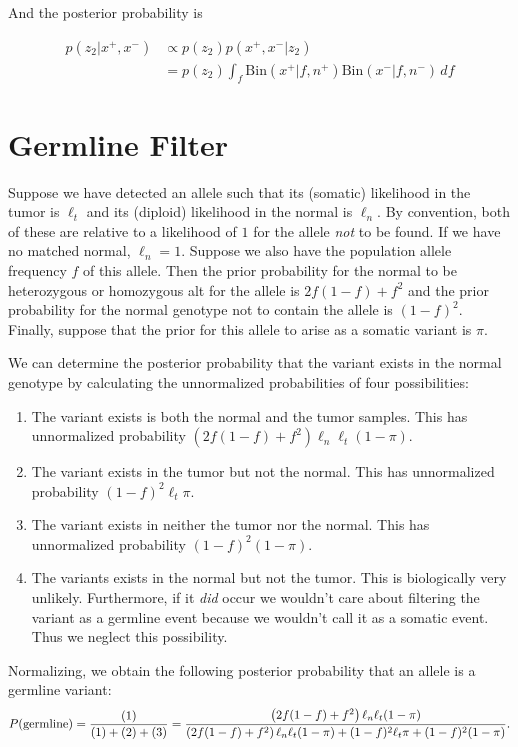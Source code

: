 \documentclass[nofootinbib,amssymb,amsmath]{revtex4}
\begin{document}
And the posterior probability is

\begin{align}
p(z_2 |x^+, x^-) & \propto p(z_2) p(x^+, x^- | z_2) \\
                         & = p(z_2) \int_{f}  \mathrm{Bin}(x^+ | f, n^+) \mathrm{Bin}(x^- | f, n^-) \,df
\end{align}


\section{Germline Filter}\label{germline-filter}
Suppose we have detected an allele such that its (somatic) likelihood in the tumor is $\ell_t$ and its (diploid) likelihood in the normal is $\ell_n$.  By convention, both of these are relative to a likelihood of $1$ for the allele \textit{not} to be found.  If we have no matched normal, $\ell_n = 1$.  Suppose we also have the population allele frequency $f$ of this allele.  Then the prior probability for the normal to be heterozygous or homozygous alt for the allele is $2f(1-f) + f^2$ and the prior probability for the normal genotype not to contain the allele is $(1-f)^2$.  Finally, suppose that the prior for this allele to arise as a somatic variant is $\pi$.

We can determine the posterior probability that the variant exists in the normal genotype by calculating the unnormalized probabilities of four possibilities:
\begin{enumerate}
\item The variant exists is both the normal and the tumor samples.  This has unnormalized probability $\left(2f(1-f) + f^2 \right) \ell_n \ell_t (1 - \pi)$.
\item The variant exists in the tumor but not the normal.  This has unnormalized probability $(1-f)^2 \ell_t \pi$.
\item The variant exists in neither the tumor nor the normal.  This has unnormalized probability $(1-f)^2 (1 - \pi)$.
\item The variants exists in the normal but not the tumor.  This is biologically very unlikely.  Furthermore, if it \textit{did} occur we wouldn't care about filtering the variant as a germline event because we wouldn't call it as a somatic event.  Thus we neglect this possibility.
\end{enumerate}

Normalizing, we obtain the following posterior probability that an allele is a germline variant:
\begin{equation}
P({\rm germline}) = \frac{(1)}{(1) + (2) + (3)} = \frac{\left(2f(1-f) + f^2 \right) \ell_n \ell_t (1 - \pi)}{\left(2f(1-f) + f^2 \right) \ell_n \ell_t (1 - \pi) + (1-f)^2 \ell_t \pi + (1-f)^2 (1 - \pi)}.
\end{equation}
\end{document}
